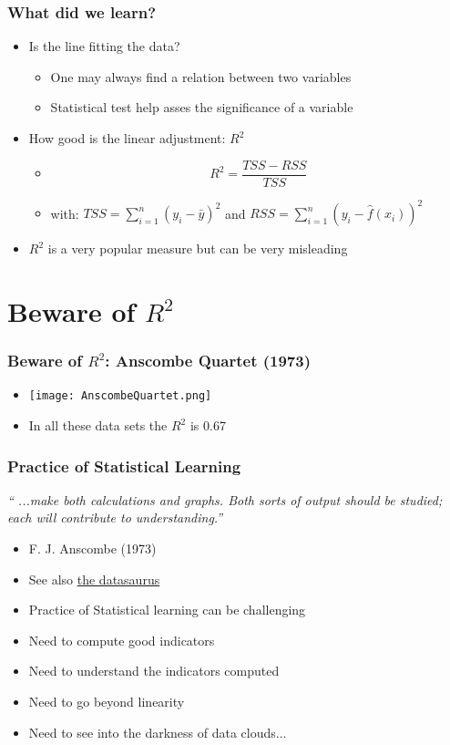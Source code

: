 \documentclass[xcolor=x11names,compress, aspectratio=169]{beamer}
\renewcommand{\(}{\begin{columns}}
\renewcommand{\)}{\end{columns}}
\newcommand{\<}[1]{\begin{column}{#1}}
\renewcommand{\>}{\end{column}}
\begin{document}
\begin{frame} %
\frametitle{What did we learn?}
 \begin{itemize}
  \item<+-> Is the line fitting the data?
   \begin{itemize}
      \item<+->[] One may always find a relation between two variables
      \item<+->[] Statistical test help asses the significance of a variable
  \end{itemize}
  \item<+-> How good is the linear adjustment: $R^2$
  \begin{itemize}
      \item<+->[] $$R^2 = \frac{TSS- RSS}{TSS}$$
      \item<+->[] with:  $TSS= \sum_{i=1}^n (y_i -\bar{y})^2 $ and $RSS= \sum_{i=1}^n (y_i - \widehat{f}(x_i))^2 $
 \end{itemize}
 \item<+-> $R^2$ is a very popular measure but can be very misleading
 \end{itemize}
\end{frame}


\section{Beware of $R^2$ }

\begin{frame} %
\frametitle{Beware of $R^2$: Anscombe Quartet (1973)}
\pause
 \begin{itemize}
  \item<+->[] \texttt{[image: AnscombeQuartet.png]}
  \item<+->[] In all these data sets the $R^2$ is 0.67
 \end{itemize}
\end{frame}


\begin{frame} %
\frametitle{Practice of Statistical Learning}
\begin{center}
\emph{`` ...make both calculations and graphs. Both sorts of output should be studied; each will contribute to understanding.''}
\end{center}
\begin{itemize}
 \item<+->[]\scriptsize{F. J. Anscombe (1973)}
 \item<+->[] \scriptsize{See also \href{https://www.r-bloggers.com/2017/05/the-datasaurus-dozen/}{the datasaurus}}
  \item<+->Practice of Statistical learning can be challenging
  \item<+->[] Need to compute good indicators
  \item<+->[] Need to understand the indicators computed
  \item<+->[] Need to go beyond linearity
  \item<+->[] Need to see into the darkness of data clouds...
 \end{itemize}
\end{frame}
\end{document}
